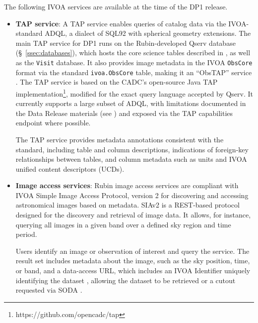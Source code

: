 The following \gls{IVOA} services are available at the time of the \gls{DP1} release.
\begin{itemize}
\vspace{0.1cm}
\item \textbf{\gls{TAP} service}: A TAP service \citep[][]{2019ivoa.spec.0927D} enables queries of catalog data via the IVOA-standard \gls{ADQL}, a dialect of SQL92 with spherical geometry extensions.
The main \gls{TAP} service for \gls{DP1} runs on the Rubin-developed \gls{Qserv} database (\S~\ref{ssec:databases}), which hosts the core science tables described in , as well as the \texttt{Visit} database.
It also provides image metadata in the IVOA \texttt{ObsCore} format via the standard \texttt{ivoa.ObsCore} table, making it an ``ObsTAP'' service \citep[][]{2017ivoa.spec.0509L}.
The TAP service is based on the \gls{CADC}'s open-source Java TAP implementation\footnote{https://github.com/opencadc/tap}, modified for the exact query language accepted by Qserv.
It currently supports a large subset of ADQL, with limitations documented in the Data Release materials (see ) and exposed via the TAP capabilities endpoint where possible. \

The TAP service provides metadata annotations consistent with the standard, including table and column descriptions, indications of foreign-key relationships between tables, and column metadata such as units and \gls{IVOA} unified content descriptors (UCDs).

\vspace{0.1cm}
\item \textbf{Image access services}: Rubin image access services are compliant with \gls{IVOA} Simple Image Access Protocol, version 2 \citep[SIAv2;][]{2025arXiv250100544J,2015ivoa.spec.1223D}
for discovering and accessing astronomical images based on \gls{metadata}.
SIAv2 is a \gls{REST}-based protocol designed for the discovery and retrieval of image data. It allows, for instance, querying all images in a given band over a defined sky region and time period.

Users identify an image or observation of interest and query the service.
The result set includes \gls{metadata} about the image, such as the sky position, time, or band, and a data-access URL, which includes an IVOA Identifier uniquely identifying the dataset \citep[][]{DMTN-302}, allowing the dataset to be retrieved or a cutout requested via \gls{SODA}  \citep[SODA;][]{2017ivoa.spec.0517B}.


\end{itemize}
